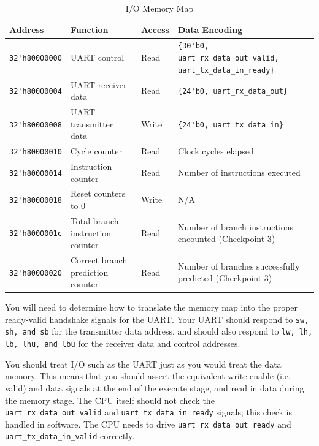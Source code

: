 \documentclass[11pt]{article}
\begin{document}
\begin{table}[hbt]
  \begin{center}
    \caption{I/O Memory Map}
    \label{mem_map1}
    \begin{adjustbox}{width=\columnwidth,center}
    \begin{tabular}{l l l l}
      \toprule
      \textbf{Address} & \textbf{Function} & \textbf{Access} & \textbf{Data Encoding}\\
      \midrule
      \verb|32'h80000000| & UART control & Read & \verb|{30'b0, uart_rx_data_out_valid, uart_tx_data_in_ready}| \\
      \verb|32'h80000004| & UART receiver data & Read & \verb|{24'b0, uart_rx_data_out}| \\
      \verb|32'h80000008| & UART transmitter data & Write & \verb|{24'b0, uart_tx_data_in}| \\
      \midrule
      \verb|32'h80000010| & Cycle counter & Read & Clock cycles elapsed \\
      \verb|32'h80000014| & Instruction counter & Read & Number of instructions executed \\
      \verb|32'h80000018| & Reset counters to 0 & Write & N/A \\
      \verb|32'h8000001c| & Total branch instruction 
 counter & Read & Number of branch instructions 
 encounted (Checkpoint 3) \\
      \verb|32'h80000020| & Correct branch prediction counter & Read & Number of branches successfully predicted (Checkpoint 3)  \\
      \bottomrule
    \end{tabular}
    \end{adjustbox}
  \end{center}
\end{table}

You will need to determine how to translate the memory map into the proper ready-valid handshake signals for the UART.
Your UART should respond to \verb|sw, sh, and sb| for the transmitter data address, and should also respond to \verb|lw, lh, lb, lhu, and lbu| for the receiver data and control addresses.

You should treat I/O such as the UART just as you would treat the data memory.
This means that you should assert the equivalent write enable (i.e. valid) and data signals at the end of the execute stage, and read in data during the memory stage.
The CPU itself should not check the \verb|uart_rx_data_out_valid| and \verb|uart_tx_data_in_ready| signals; this check is handled in software.
The CPU needs to drive \verb|uart_rx_data_out_ready| and \verb|uart_tx_data_in_valid| correctly.
\end{document}
